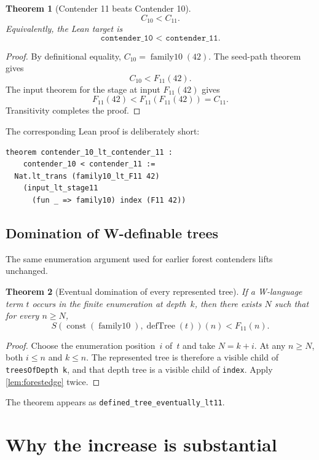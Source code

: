 \documentclass[11pt]{article}
\newtheorem{theorem}{Theorem}[section]
\theoremstyle{definition}
\theoremstyle{remark}
\newcommand{\Cten}{\ensuremath{C_{10}}}
\newcommand{\Celeven}{\ensuremath{C_{11}}}
\newcommand{\code}[1]{\texttt{#1}}
\begin{document}
\begin{theorem}[Contender 11 beats Contender 10]
\label{thm:main}
\[
  \Cten<\Celeven.
\]
Equivalently, the Lean target is
\[
  \code{contender\_10 < contender\_11}.
\]
\end{theorem}

\begin{proof}
By definitional equality,
$\Cten=\operatorname{family10}(42)$. The seed-path theorem gives
\[
  \Cten<F_{11}(42).
\]
The input theorem for the stage at input $F_{11}(42)$ gives
\[
  F_{11}(42)<F_{11}(F_{11}(42))=\Celeven.
\]
Transitivity completes the proof.
\end{proof}

The corresponding Lean proof is deliberately short:

\begin{lstlisting}
theorem contender_10_lt_contender_11 :
    contender_10 < contender_11 :=
  Nat.lt_trans (family10_lt_F11 42)
    (input_lt_stage11
      (fun _ => family10) index (F11 42))
\end{lstlisting}

\subsection{Domination of W-definable trees}

The same enumeration argument used for earlier forest contenders lifts
unchanged.

\begin{theorem}[Eventual domination of every represented tree]
\label{thm:eventual}
If a W-language term $t$ occurs in the finite enumeration at depth~$k$, then
there exists $N$ such that for every $n\ge N$,
\[
  S(\operatorname{const}(\operatorname{family10}),
    \operatorname{defTree}(t))(n)
  <F_{11}(n).
\]
\end{theorem}

\begin{proof}
Choose the enumeration position~$i$ of~$t$ and take $N=k+i$. At any
$n\ge N$, both $i\le n$ and $k\le n$. The represented tree is therefore a
visible child of \code{treesOfDepth k}, and that depth tree is a visible child
of \code{index}. Apply \cref{lem:forestedge} twice.
\end{proof}

The theorem appears as \code{defined\_tree\_eventually\_lt11}.

\section{Why the increase is substantial}
\end{document}
